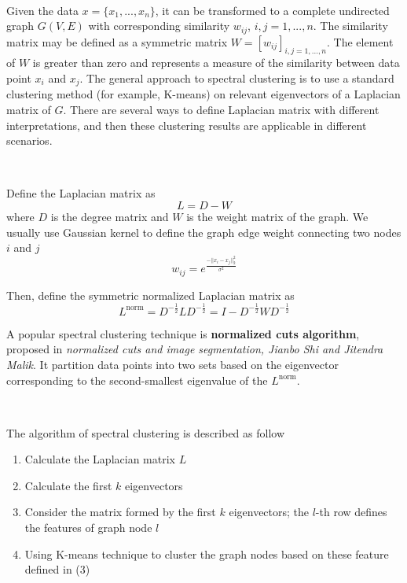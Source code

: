\documentclass[a4paper]{article}
\begin{document}
\

Given the data $x = \{ x_1, ..., x_n\}$, it can be transformed to a complete undirected graph $G(V, E)$ with corresponding similarity $w_{ij}$, $i,j=1, ..., n$. The similarity matrix may be defined as a symmetric matrix $W = [w_{ij}]_{i,j=1,...,n}$. The element of $W$ is greater than zero and represents a measure of the similarity between data point $x_i$ and $x_j$. The general approach to spectral clustering is to use a standard clustering method (for example, K-means) on relevant eigenvectors of a Laplacian matrix of $G$. There are several ways to define Laplacian matrix with different interpretations, and then these clustering results are applicable in different scenarios.

\

Define the Laplacian matrix as 
\begin{equation}
	L = D-W
\end{equation}
where $D$ is the degree matrix and $W$ is the weight matrix of the graph. We usually use Gaussian kernel to define the graph edge weight connecting two nodes $i$ and $j$
\begin{equation}
		w_{ij} = e^{\frac{- || x_i - x_j || ^2_{2}}{\sigma^2}}
\end{equation}


Then, define the symmetric normalized Laplacian matrix as 
\begin{equation}
	L^{\mbox{norm}} = D^{-\frac{1}{2}} L D^{-\frac{1}{2}}  =I - D^{-\frac{1}{2}} W D^{-\frac{1}{2}}
\end{equation}

A popular spectral clustering technique is \textbf{normalized cuts algorithm}, proposed in \textit{normalized cuts and image segmentation, Jianbo Shi and Jitendra Malik}. It partition data points into two sets based on the eigenvector corresponding to the second-smallest eigenvalue of the $L^{\mbox{norm}}$.

\

The algorithm of spectral clustering is described as follow

\begin{enumerate}
	\item Calculate the Laplacian matrix $L$
	\item Calculate the first $k$ eigenvectors
	\item Consider the matrix formed by the first $k$ eigenvectors; the $l$-th row defines the features of graph node $l$
	\item Using K-means technique to cluster the graph nodes based on these feature defined in (3)
\end{enumerate}
\end{document}
